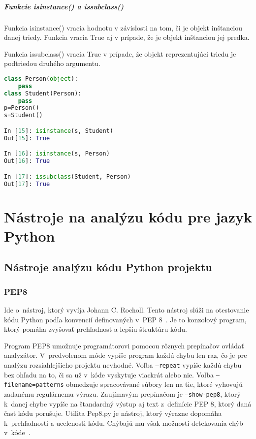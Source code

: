 \documentclass[11pt,oneside,final]{fithesis2}
\begin{document}
		\paragraph{Funkcie isinstance() a issubclass()}
		Funkcia isinstance() vracia hodnotu v závislosti na tom, či je objekt inštanciou danej triedy. Funkcia vracia True aj v prípade, že je objekt inštanciou jej predka.
		
		Funkcia issubclass() vracia True v prípade, že objekt reprezentujúci triedu je podtriedou druhého argumentu.

\begin{lstlisting}[language=python]	
class Person(object):
    pass
class Student(Person):
    pass
p=Person()
s=Student()

In [15]: isinstance(s, Student)
Out[15]: True

In [16]: isinstance(s, Person)
Out[16]: True

In [17]: issubclass(Student, Person)
Out[17]: True
\end{lstlisting}		
			
\chapter{Nástroje na analýzu kódu pre jazyk Python}
	\section{Nástroje analýzu kódu Python projektu}	


\subsection{PEP8}
	Ide o~nástroj, ktorý vyvíja Johann C. Rocholl. Tento nástroj slúži na otestovanie kódu Python podľa konvencií definovaných v~PEP 8~\cite{pep8}. Je to konzolový program, ktorý pomáha zvyšovať prehľadnosť a lepšiu štruktúru kódu. 
	
	Program PEP8 umožnuje programátorovi pomocou rôznych prepínačov ovládať analyzátor. V~predvolenom móde vypíše program každú chybu len raz, čo je pre analýzu rozsiahlejšieho projektu nevhodné. Voľba \texttt{–repeat} vypíše každú chybu bez ohľadu na to, či sa už v~kóde vyskytuje viackrát alebo nie. Voľba \texttt{–filename=patterns} obmedzuje spracovávané súbory len na tie, ktoré vyhovujú zadanému regulárnemu výrazu. Zaujímavým prepínačom je \texttt{–show-pep8}, ktorý k~danej chybe vypíše na štandardný výstup aj text z~definície PEP 8, ktorý daná časť kódu porušuje.
    Utilita Pep8.py je nástroj, ktorý výrazne dopomáha k~prehľadnosti a ucelenosti kódu. Chýbajú mu však možnosti detekovania chýb v~kóde~\cite{pep8}.
\end{document}
